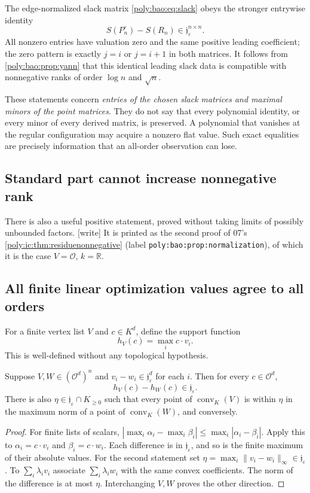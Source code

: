 \documentclass[11pt,a4paper]{article}
\numberwithin{equation}{section}
\theoremstyle{plain}
\newcommand{\wtag}{\textup{[write]}}%
\newcommand{\R}{\mathbb R}
\newcommand{\eps}{\varepsilon}
\newcommand{\conv}{\operatorname{conv}}
\newcommand{\OO}{\mathcal O}
\newcommand{\JJ}{\mathfrak j}
\begin{document}
The edge-normalized slack matrix \eqref{poly:bao:eq:slack} obeys the stronger
entrywise identity
\begin{equation}\label{poly:bao:eq:slackflat}
 S(P^\circ_n)-S(R_n)\in\JJ_\eps^{n\times n}.
\end{equation}
All nonzero entries have valuation zero and the same positive leading
coefficient; the zero pattern is exactly $j=i$ or $j=i+1$ in both
matrices. It follows from \cref{poly:bao:prop:yann} that this identical leading
slack data is compatible with nonnegative ranks of order $\log n$ and
$\sqrt n$.

These statements concern \emph{entries of the chosen slack matrices and
maximal minors of the point matrices}. They do not say that every
polynomial identity, or every minor of every derived matrix, is preserved.
A polynomial that vanishes at the regular configuration may acquire a
nonzero flat value. Such exact equalities are precisely information that
an all-order observation can lose.

\subsection{Standard part cannot increase nonnegative rank}
There is also a useful positive statement, proved without taking limits of
possibly unbounded factors.
\wtag{} It is printed as the second proof of 07's
\cref{poly:ic:thm:residuenonnegative} (label
\texttt{poly:bao:prop:normalization}), of which it is the case
$V=\OO$, $k=\R$.

\subsection{All finite linear optimization values agree to all orders}
For a finite vertex list $V$ and $c\in K^d$, define the support function
\[
 h_V(c)=\max_i c\cdot v_i.
\]
This is well-defined without any topological hypothesis.

\begin{proposition}\label{poly:bao:prop:observations}
Suppose $V,W\in(\OO^d)^n$ and $v_i-w_i\in\JJ_\eps^d$ for each $i$.
Then for every $c\in\OO^d$,
\[
 h_V(c)-h_W(c)\in\JJ_\eps.
\]
There is also $\eta\in\JJ_\eps\cap K_{\geq0}$ such that every point of
$\conv_K(V)$ is within $\eta$ in the maximum norm of a point of
$\conv_K(W)$, and conversely.
\end{proposition}
\begin{proof}
For finite lists of scalars,
$|\max_i\alpha_i-\max_i\beta_i|\leq\max_i|\alpha_i-\beta_i|$.
Apply this to $\alpha_i=c\cdot v_i$ and $\beta_i=c\cdot w_i$.
Each difference is in $\JJ_\eps$, and so is the finite maximum of their
absolute values. For the second statement set
$\eta=\max_i\|v_i-w_i\|_\infty\in\JJ_\eps$.
To $\sum_i\lambda_i v_i$ associate $\sum_i\lambda_i w_i$ with the
same convex coefficients. The norm of the difference is at most $\eta$.
Interchanging $V,W$ proves the other direction.
\end{proof}
\end{document}
